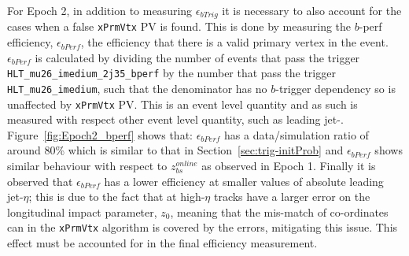 For Epoch 2, in addition to measuring $\epsilon_{bTrig}$ it is necessary
to also account for the cases when a false \verb|xPrmVtx| PV is found.
This is done by measuring the $b$-perf efficiency, $\epsilon_{bPerf}$,
the efficiency that there is a valid primary vertex in the event.
$\epsilon_{bPerf}$ is calculated by dividing the number of events that pass the trigger
\verb|HLT_mu26_imedium_2j35_bperf| by the number that pass the trigger \verb|HLT_mu26_imedium|,
such that the denominator has no $b$-trigger dependency so is unaffected by \verb|xPrmVtx| PV.
This is an event level quantity and as such is measured with respect other event level quantity, such as leading jet-\pT.
Figure~\ref{fig:Epoch2_bperf} shows that:
$\epsilon_{bPerf}$ has a data/simulation ratio of around 80\%  which is similar to that in Section~\ref{sec:trig-initProb} and
$\epsilon_{bPerf}$ shows similar behaviour with respect to  $z_{bs}^{online}$ as observed in Epoch 1.
Finally it is observed that $\epsilon_{bPerf}$ has a lower efficiency at smaller values of absolute leading jet-$\eta$;
this is due to the fact that at high-$\eta$ tracks have a larger error on the longitudinal impact parameter, $z_0$,
meaning that the mis-match of co-ordinates can in the \verb|xPrmVtx| algorithm is covered by the errors, mitigating this issue.
This effect must be accounted for in the final efficiency measurement.

